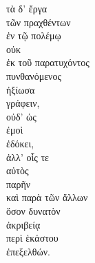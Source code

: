 {\large
\begin{greek}
\noindent τὰ δ' ἔργα \\
\tabto{2em} τῶν πραχθέντων \\
\tabto{2em} ἐν τῷ πολέμῳ \\

\noindent οὐκ \\
\tabto{2em} ἐκ τοῦ παρατυχόντος \\
πυνθανόμενος \\
ἠξίωσα \\
\tabto{2em} γράφειν, \\
οὐδ' ὡς \\
\tabto{2em} ἐμοὶ \\
\tabto{2em} ἐδόκει, \\
ἀλλ' οἷς τε \\
\tabto{2em} αὐτὸς \\
\tabto{2em} παρῆν \\
καὶ παρὰ τῶν ἄλλων \\
\tabto{4em} ὅσον δυνατὸν \\
\tabto{2em} ἀκριβείᾳ \\
\tabto{2em} περὶ ἑκάστου \\
ἐπεξελθών.\\

\end{greek}
}

